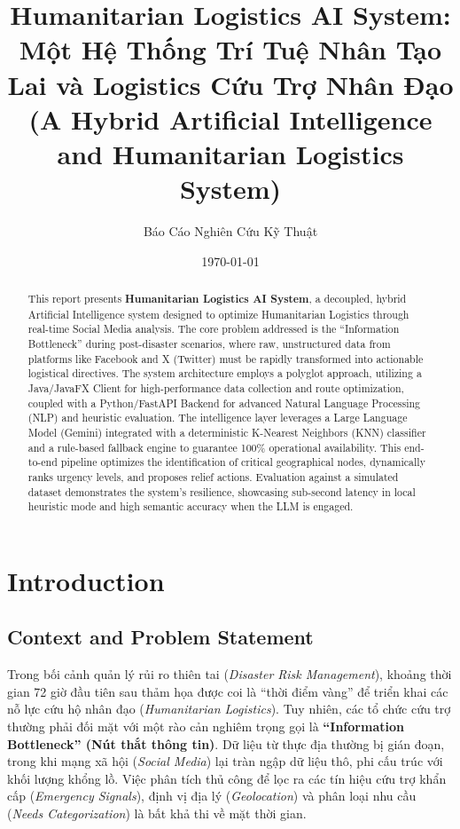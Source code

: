 \documentclass[12pt,a4paper]{article}
\title{Humanitarian Logistics AI System: Một Hệ Thống Trí Tuệ Nhân Tạo Lai và Logistics Cứu Trợ Nhân Đạo\\ \large (A Hybrid Artificial Intelligence and Humanitarian Logistics System)}
\author{Báo Cáo Nghiên Cứu Kỹ Thuật}
\date{\today}
\begin{document}
\maketitle

\begin{abstract}
This report presents \textbf{Humanitarian Logistics AI System}, a decoupled, hybrid Artificial Intelligence system designed to optimize Humanitarian Logistics through real-time Social Media analysis. The core problem addressed is the ``Information Bottleneck'' during post-disaster scenarios, where raw, unstructured data from platforms like Facebook and X (Twitter) must be rapidly transformed into actionable logistical directives. The system architecture employs a polyglot approach, utilizing a Java/JavaFX Client for high-performance data collection and route optimization, coupled with a Python/FastAPI Backend for advanced Natural Language Processing (NLP) and heuristic evaluation. The intelligence layer leverages a Large Language Model (Gemini) integrated with a deterministic K-Nearest Neighbors (KNN) classifier and a rule-based fallback engine to guarantee 100\% operational availability. This end-to-end pipeline optimizes the identification of critical geographical nodes, dynamically ranks urgency levels, and proposes relief actions. Evaluation against a simulated dataset demonstrates the system's resilience, showcasing sub-second latency in local heuristic mode and high semantic accuracy when the LLM is engaged.
\end{abstract}

\newpage

\section{Introduction}

\subsection{Context and Problem Statement}
Trong bối cảnh quản lý rủi ro thiên tai (\textit{Disaster Risk Management}), khoảng thời gian 72 giờ đầu tiên sau thảm họa được coi là ``thời điểm vàng'' để triển khai các nỗ lực cứu hộ nhân đạo (\textit{Humanitarian Logistics}). Tuy nhiên, các tổ chức cứu trợ thường phải đối mặt với một rào cản nghiêm trọng gọi là \textbf{``Information Bottleneck'' (Nút thắt thông tin)}. Dữ liệu từ thực địa thường bị gián đoạn, trong khi mạng xã hội (\textit{Social Media}) lại tràn ngập dữ liệu thô, phi cấu trúc với khối lượng khổng lồ. Việc phân tích thủ công để lọc ra các tín hiệu cứu trợ khẩn cấp (\textit{Emergency Signals}), định vị địa lý (\textit{Geolocation}) và phân loại nhu cầu (\textit{Needs Categorization}) là bất khả thi về mặt thời gian.
\end{document}
